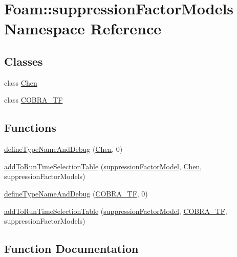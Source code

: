 \hypertarget{namespaceFoam_1_1suppressionFactorModels}{}\section{Foam\+:\+:suppression\+Factor\+Models Namespace Reference}
\label{namespaceFoam_1_1suppressionFactorModels}
\subsection*{Classes}
\begin{DoxyCompactItemize}
\item 
class \hyperlink{classFoam_1_1suppressionFactorModels_1_1Chen}{Chen}
\item 
class \hyperlink{classFoam_1_1suppressionFactorModels_1_1COBRA__TF}{C\+O\+B\+R\+A\+\_\+\+TF}
\end{DoxyCompactItemize}
\subsection*{Functions}
\begin{DoxyCompactItemize}
\item 
\hyperlink{namespaceFoam_1_1suppressionFactorModels_a31f655dfd5e837a344405156cf5a39a7}{define\+Type\+Name\+And\+Debug} (\hyperlink{classFoam_1_1suppressionFactorModels_1_1Chen}{Chen}, 0)
\item 
\hyperlink{namespaceFoam_1_1suppressionFactorModels_a489a0a075ebf35c5d1af0047b4278c25}{add\+To\+Run\+Time\+Selection\+Table} (\hyperlink{classFoam_1_1suppressionFactorModel}{suppression\+Factor\+Model}, \hyperlink{classFoam_1_1suppressionFactorModels_1_1Chen}{Chen}, suppression\+Factor\+Models)
\item 
\hyperlink{namespaceFoam_1_1suppressionFactorModels_a093540deab4a395f6e1bf765b9d18452}{define\+Type\+Name\+And\+Debug} (\hyperlink{classFoam_1_1suppressionFactorModels_1_1COBRA__TF}{C\+O\+B\+R\+A\+\_\+\+TF}, 0)
\item 
\hyperlink{namespaceFoam_1_1suppressionFactorModels_a976a9052186d35f81e82dd534445c532}{add\+To\+Run\+Time\+Selection\+Table} (\hyperlink{classFoam_1_1suppressionFactorModel}{suppression\+Factor\+Model}, \hyperlink{classFoam_1_1suppressionFactorModels_1_1COBRA__TF}{C\+O\+B\+R\+A\+\_\+\+TF}, suppression\+Factor\+Models)
\end{DoxyCompactItemize}


\subsection{Function Documentation}
\mbox{\label{namespaceFoam_1_1suppressionFactorModels_a31f655dfd5e837a344405156cf5a39a7}} 
